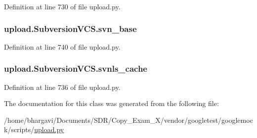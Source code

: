 Definition at line 730 of file upload.\+py.

\subsubsection[{\texorpdfstring{svn\+\_\+base}{svn_base}}]{\setlength{\rightskip}{0pt plus 5cm}upload.\+Subversion\+V\+C\+S.\+svn\+\_\+base}\hypertarget{classupload_1_1_subversion_v_c_s_a60645c40d2fea4cd52881576bd13341f}{}\label{classupload_1_1_subversion_v_c_s_a60645c40d2fea4cd52881576bd13341f}


Definition at line 740 of file upload.\+py.

\subsubsection[{\texorpdfstring{svnls\+\_\+cache}{svnls_cache}}]{\setlength{\rightskip}{0pt plus 5cm}upload.\+Subversion\+V\+C\+S.\+svnls\+\_\+cache}\hypertarget{classupload_1_1_subversion_v_c_s_aa801782f807674b06f491df5d7ca9942}{}\label{classupload_1_1_subversion_v_c_s_aa801782f807674b06f491df5d7ca9942}


Definition at line 736 of file upload.\+py.



The documentation for this class was generated from the following file\+:\begin{DoxyCompactItemize}
\item 
/home/bhargavi/\+Documents/\+S\+D\+R/\+Copy\+\_\+\+Exam\+\_\+X/vendor/googletest/googlemock/scripts/\hyperlink{googlemock_2scripts_2upload_8py}{upload.\+py}\end{DoxyCompactItemize}
